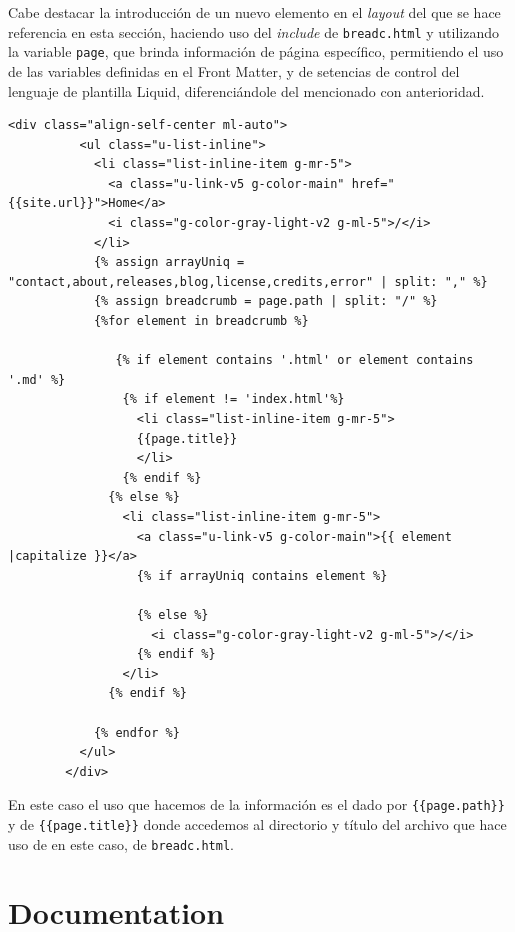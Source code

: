 Cabe destacar la introducción de un nuevo elemento en el \textit{layout} del que se hace referencia en esta sección, haciendo uso del \textit{include} de \texttt{breadc.html} y utilizando la variable \texttt{page}, que brinda información de página específico, permitiendo el uso de las variables definidas en el Front Matter, y de setencias de control del lenguaje de plantilla Liquid,  diferenciándole del mencionado con anterioridad. 

\begin{lstlisting}[style=htmlcssjs,caption=Breadcrumber,label={code:breadcrum}]
  <div class="align-self-center ml-auto">
          <ul class="u-list-inline">
            <li class="list-inline-item g-mr-5">
              <a class="u-link-v5 g-color-main" href="{{site.url}}">Home</a>
              <i class="g-color-gray-light-v2 g-ml-5">/</i>
            </li>
            {% assign arrayUniq = "contact,about,releases,blog,license,credits,error" | split: "," %}
            {% assign breadcrumb = page.path | split: "/" %}
            {%for element in breadcrumb %}

               {% if element contains '.html' or element contains '.md' %}
                {% if element != 'index.html'%}
                  <li class="list-inline-item g-mr-5">
                  {{page.title}}
                  </li>
                {% endif %}
              {% else %}
                <li class="list-inline-item g-mr-5">
                  <a class="u-link-v5 g-color-main">{{ element |capitalize }}</a>
                  {% if arrayUniq contains element %}

                  {% else %}
                    <i class="g-color-gray-light-v2 g-ml-5">/</i>
                  {% endif %}
                </li>
              {% endif %}

            {% endfor %}
          </ul>
        </div>
\end{lstlisting}

En este caso el uso que hacemos de la información es el dado por \texttt{\{\{page.path\}\}} y de \texttt{\{\{page.title\}\}} donde accedemos al directorio y título del archivo que hace uso de en este caso, de \texttt{breadc.html}.

\section{Documentation}
\label{sec:docWeb}

